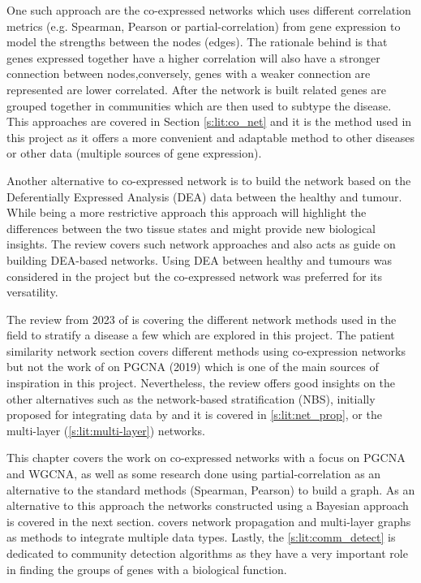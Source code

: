 One such approach are the co-expressed networks which uses different correlation metrics (e.g. Spearman, Pearson or partial-correlation) from gene expression to model the strengths between the nodes (edges). The rationale behind is that genes expressed together have a higher correlation will also have a stronger connection between nodes,conversely, genes with a weaker connection are represented are lower correlated. After the network is built related genes are grouped together in communities which are then used to subtype the disease. This approaches are covered in Section \ref{s:lit:co_net} and it is the method used in this project as it offers a more convenient and adaptable method to other diseases or other data (multiple sources of gene expression).

Another alternative to co-expressed network is to build the network based on the Deferentially Expressed Analysis (DEA) data between the healthy and tumour. While being a more restrictive approach this approach will highlight the differences between the two tissue states and might provide new biological insights. The review \citet{Van_Dam2018-id} covers such network approaches and also acts as guide on building DEA-based networks. Using DEA between healthy and tumours was considered in the project but the co-expressed network was preferred for its versatility.

The review from 2023 of \citet{Petti2023-qo} is covering the different network methods used in the field to stratify a disease a few which are explored in this project. The patient similarity network section covers different methods using co-expression networks but not the work of \citet{Care2019-ij} on PGCNA (2019) which is one of the main sources of inspiration in this project. Nevertheless, the review offers good insights on the other alternatives such as the network-based stratification (NBS), initially proposed for integrating data by \citet{Hofree2013-ld} and it is covered in \cref{s:lit:net_prop}, or the multi-layer (\cref{s:lit:multi-layer}) networks.

This chapter covers the work on co-expressed networks with a focus on PGCNA and WGCNA, as well as some research done using partial-correlation as an alternative to the standard methods (Spearman, Pearson) to build a graph. As an alternative to this approach the networks constructed using a Bayesian approach is covered in the next section.  covers network propagation and multi-layer graphs as methods to integrate multiple data types. Lastly, the \cref{s:lit:comm_detect} is dedicated to community detection algorithms as they have a very important role in finding the groups of genes with a biological function.

